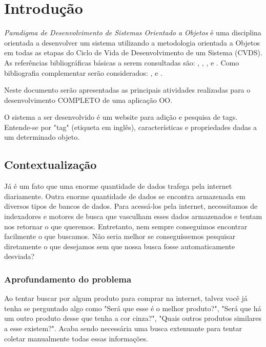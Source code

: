 \chapter{Introdução}

\textit{Paradigma de Desenvolvimento de Sistemas Orientado a Objetos} é uma disciplina orientada a desenvolver um sistema utilizando a metodologia orientada a Objetos em todas as etapas do Ciclo de Vida de Desenvolvimento de um Sistema (CVDS). As referências bibliográficas básicas a serem consultadas são: \cite{Dennis2014}, \cite{Engholm2013}, \cite{Guedes2011}, \cite{Sommerville2018} e \cite{Wazlawick2011}. Como bibliografia complementar serão considerados: \cite{Satzinger2012}, \cite{Shelly2012} e \cite{Furgeri2013}.

Neste documento serão apresentadas as principais atividades realizadas para o desenvolvimento COMPLETO de uma aplicação OO.

O sistema a ser desenvolvido é um website para adição e pesquisa de tags. Entende-se por "tag" (etiqueta em inglês), características e propriedades dadas a um determinado objeto.

\section{Contextualização}

    Já é um fato que uma enorme quantidade de dados trafega pela internet diariamente. Outra enorme quantidade de dados se encontra armazenada em diversos tipos de bancos de dados. Para acessá-los pela internet, necessitamos de indexadores e motores de busca que vasculham esses dados armazenados e tentam nos retornar o que queremos. Entretanto, nem sempre conseguimos encontrar facilmente o que buscamos. Não seria melhor se conseguíssemos pesquisar diretamente o que desejamos sem que nossa busca fosse automaticamente desviada?

    \subsection{Aprofundamento do problema}

        Ao tentar buscar por algum produto para comprar na internet, talvez você já tenha se perguntado algo como "Será que esse é o melhor produto?", "Será que há um outro produto desse que tenha a cor cinza?", "Quais outros produtos similares a esse existem?". Acaba sendo necessária uma busca extenuante para tentar coletar manualmente todas essas informações.


